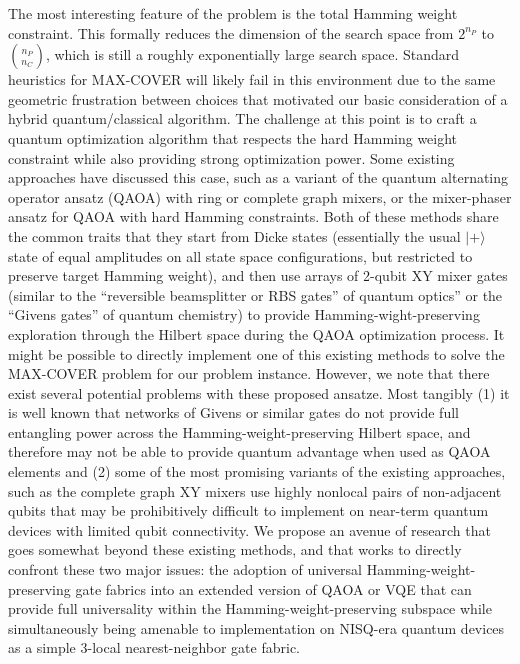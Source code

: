 \documentclass[aps,pra,twocolumn,superscriptaddress,groupedaddress]{revtex4}  %
\begin{document}
The most interesting feature of the problem is the total Hamming weight
constraint. This formally reduces the dimension of the search space from
$2^{n_{P}}$ to ${n_{P} \choose n_{C} }$, which is still a roughly exponentially
large search space. Standard heuristics for MAX-COVER will likely fail in this
environment due to the same geometric frustration between choices that motivated
our basic consideration of a hybrid quantum/classical algorithm. The challenge
at this point is to craft a quantum optimization algorithm that respects the
hard Hamming weight constraint while also providing strong optimization power.
Some existing approaches have discussed this case, such as a variant of the
quantum alternating operator ansatz (QAOA) with ring or complete graph mixers,
or the mixer-phaser ansatz for QAOA with hard Hamming constraints. Both of these
methods share the common traits that they start from Dicke states (essentially
the usual $|+\rangle$ state of equal amplitudes on all state space
configurations, but restricted to preserve target Hamming weight), and then use
arrays of 2-qubit XY mixer gates (similar to the ``reversible beamsplitter or RBS
gates'' of quantum optics'' or the ``Givens gates'' of quantum chemistry) to
provide Hamming-wight-preserving exploration through the Hilbert space during
the QAOA optimization process. It might be possible to directly implement one of
this existing methods to solve the MAX-COVER problem for our problem instance.
However, we note that there exist several potential problems with these
proposed ansatze. Most tangibly (1) it is well known that networks of Givens or
similar gates do not provide full entangling power across the
Hamming-weight-preserving Hilbert space, and therefore may not be able to
provide quantum advantage when used as QAOA elements and (2) some of the most
promising variants of the existing approaches, such as the complete graph XY
mixers use highly nonlocal pairs of non-adjacent qubits that may be
prohibitively difficult to implement on near-term quantum devices with limited
qubit connectivity. We propose an avenue of research that goes somewhat beyond
these existing methods, and that works to directly confront these two major
issues: the adoption of universal Hamming-weight-preserving gate fabrics into an
extended version of QAOA or VQE that can provide full universality within the
Hamming-weight-preserving subspace while simultaneously being amenable to
implementation on NISQ-era quantum devices as a simple 3-local nearest-neighbor
gate fabric.  
\end{document}
